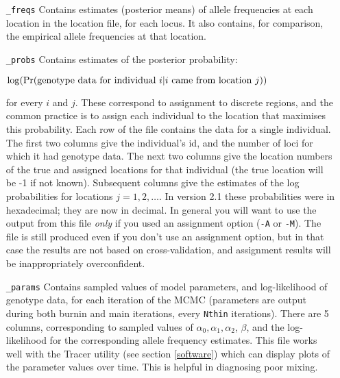 \documentclass[10pt,titlepage,times,letterpaper]{article}
\def \Pr{{\rm Pr}}
\begin{document}
\begin{enumerate}[\_params]
\item[{\tt \_freqs}] Contains estimates (posterior means) of allele
frequencies at each location in the location file, for each locus. It also contains,
for comparison, the empirical allele frequencies at that location.

\item[{\tt \_probs}] Contains estimates of the posterior probability:

$\log(\Pr(\text{genotype
data for individual $i$} | \text{$i$ came from location $j$}))$ 

for every $i$ and $j$. These correspond to assignment to discrete
regions, and the common practice is to assign each individual
to the location that maximises this probability. Each row of the file
contains the data for a single individual. The first two columns give
the individual's id, and the number of loci for which it had genotype
data.  The next two columns give the location numbers of the
true and assigned locations for that individual (the true location
will be -1 if not known).
Subsequent columns give the estimates of the log
probabilities for locations $j=1,2,\dots$.  In version 2.1
these probabilities were in hexadecimal; they are now in decimal.
In general you will want to
use the output from this file {\it only} if you used an
assignment option ({\tt -A} or {\tt -M}).
The file is still produced even if you
don't use an assignment option, but in that case the results are not
based on cross-validation, and assignment results will be
inappropriately overconfident.

\item[{\tt \_params}] Contains sampled values of model parameters, and
log-likelihood of genotype data, for each iteration of the MCMC
(parameters are output during both burnin and main iterations, every
{\tt Nthin} iterations). There are 5 columns, corresponding to sampled
values of $\alpha_0, \alpha_1, \alpha_2$, $\beta$, and the
log-likelihood for the corresponding allele frequency estimates.
This file works well with the Tracer utility (see section \ref{software}) 
which can display plots of the parameter values over time.  This is helpful 
in diagnosing poor mixing.


\end{enumerate}
\end{document}
